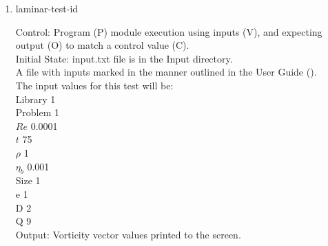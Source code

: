 \documentclass[12pt, titlepage]{article}
\newcommand{\famname}{Lattice Boltzmann Solver}
\newcounter{testcounter} %
\begin{document}
\begin{enumerate}
\begin{enumerate}
\item The Von Karman Vortex Street module shall be modified by the author to
  print the vorticity vector as output.
\item Outside of the system, the input parameter values will be written to a text file titled input.txt, as outlined in Section \ref{ext4-inputs} of the User Guide.
\item The file will be placed into the Input directory, under the home directory
  of the project.
\item {\famname} shall be run.
\item Upon completion of the module, the output values of the vorticity vector
  will be compared to the vorticity vector values from pyLBM - comparison will
  be done per cell. Comparisons can be done manually using Excel, or through a
  script.
\item Steps (a) - (e) will be repeated for each test iteration.
\item The output value of each iteration will be compared to the pseudo-oracle value.
\end{enumerate}
					
\item{laminar-test-id\thetestcounter \\}

Control: Program (P) module execution using inputs (V), and expecting output (O)
to match a control value (C).\\
					
Initial State: input.txt file is in the Input directory.\\
					
A file with inputs marked in the manner outlined in the User
Guide (\citet{LBM_UserGuide_PM}).\\The input values for this test will be:\\
Library 1\\
Problem 1\\
$Re$ 0.0001\\
$t$ 75\\
$\rho$ 1\\
$\eta_b$ 0.001\\
Size 1\\
$\mathrm{e}$ 1\\
$\mathrm{D}$ 2\\
$\mathrm{Q}$ 9\\
					
Output: Vorticity vector values printed to the screen.\\


\end{enumerate}
\end{document}
